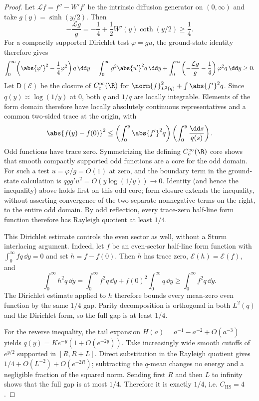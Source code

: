 \documentclass[../../main.tex]{subfiles}
\begin{document}
\begin{proof}
Let $\mathcal Lf=f''-W'f'$ be the intrinsic diffusion generator on $(0,\infty)$ and take
$g(y)=\sinh(y/2)$.  Then
\[
 -\frac{\mathcal Lg}{g}
 =-\frac14+\frac12W'(y)\coth(y/2)\ge\frac14.
\]
For a compactly supported Dirichlet test $\varphi=gu$, the ground-state identity therefore gives
\[
 \int_0^\infty\!\left(\abs{\varphi'}^2-\frac14\varphi^2\right)q\,\dd y
 =\int_0^\infty g^2\abs{u'}^2q\,\dd y
  +\int_0^\infty\left(-\frac{\mathcal Lg}{g}-\frac14\right)\varphi^2q\,\dd y
 \ge0.
\]
Let $\mathsf D(\mathcal E)$ be the closure of $C_c^\infty(\R)$ for
$\norm{f}_{L^2(q)}^2+\int\abs{f'}^2q$.  Since $q(y)\asymp\log(1/y)$ at $0$, both
$q$ and $1/q$ are locally integrable.  Elements of the form domain therefore have locally
absolutely continuous representatives and a common two-sided trace at the origin, with
\[
 \abs{f(y)-f(0)}^2
 \le\left(\int_0^y\abs{f'}^2q\right)
     \left(\int_0^y\frac{\dd s}{q(s)}\right).
\]
Odd functions have trace zero.  Symmetrizing the defining $C_c^\infty(\R)$ core shows that smooth
compactly supported odd functions are a core for the odd domain.  For such a test
$u=\varphi/g=O(1)$ at zero, and the boundary term in the ground-state calculation is
$qgg'u^2=O(y\log(1/y))\to0$.  Identity (and hence the inequality) above holds first on this odd
core; form closure extends the inequality, without asserting convergence of the two separate
nonnegative terms on the right, to the entire odd domain.
By odd reflection, every trace-zero half-line form function therefore has Rayleigh quotient at
least $1/4$.

This Dirichlet estimate controls the even sector as well, without a Sturm interlacing argument.
Indeed, let $f$ be an even-sector half-line form function with
$\int_0^\infty f q\,\dd y=0$ and set $h=f-f(0)$.  Then $h$ has trace zero,
$\mathcal E(h)=\mathcal E(f)$, and
\[
 \int_0^\infty h^2q\,\dd y
 =\int_0^\infty f^2q\,\dd y
   +f(0)^2\int_0^\infty q\,\dd y
 \ge\int_0^\infty f^2q\,\dd y.
\]
The Dirichlet estimate applied to $h$ therefore bounds every mean-zero even function by the same
$1/4$ gap.  Parity decomposition is orthogonal in both $L^2(q)$ and the Dirichlet form, so the
full gap is at least $1/4$.

For the reverse inequality, the tail expansion
$H(a)=a^{-1}-a^{-2}+O(a^{-3})$ yields
$q(y)=K e^{-y}(1+O(e^{-2y}))$.  Take increasingly wide smooth cutoffs of $e^{y/2}$ supported in
$[R,R+L]$.  Direct substitution in the Rayleigh quotient gives
$1/4+O(L^{-2})+O(e^{-2R})$; subtracting the $q$-mean changes no energy and a negligible fraction
of the squared norm.  Sending first $R$ and then $L$ to infinity shows that the full gap is at
most $1/4$.  Therefore it is exactly $1/4$, i.e. $C_{\mathrm{HS}}=4$.
\end{proof}
\end{document}
